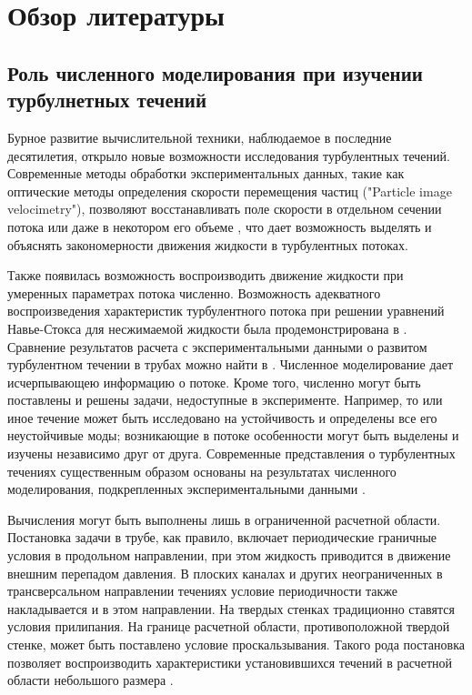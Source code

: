 \chapter{Обзор литературы}

	
\section{Роль численного моделирования при изучении турбулнетных течений}

Бурное развитие вычислительной техники, наблюдаемое в последние десятилетия, открыло новые возможности исследования турбулентных течений. Современные методы обработки экспериментальных данных, такие как оптические методы определения скорости перемещения частиц ("Particle image velocimetry"), позволяют восстанавливать поле скорости в отдельном сечении потока или даже в некотором его объеме \cite{PIVbook}, что дает возможность выделять и объяснять закономерности движения жидкости в турбулентных потоках. 

Также появилась возможность воспроизводить движение жидкости при умеренных параметрах потока численно. Возможность адекватного воспроизведения характеристик турбулентного потока при решении уравнений Навье-Стокса для несжимаемой жидкости была продемонстрирована в \cite{Kim1987}. Сравнение результатов расчета с экспериментальными данными о развитом турбулентном течении в трубах можно найти в \cite{Priymak1998, Nikitin2006}. Численное моделирование дает исчерпывающею информацию о потоке. Кроме того, численно могут быть поставлены и решены задачи, недоступные в эксперименте. Например, то или иное течение может быть исследовано на устойчивость и определены все его неустойчивые моды; возникающие в потоке особенности могут быть выделены и изучены независимо друг от друга. Современные представления о турбулентных течениях существенным образом основаны на результатах численного моделирования, подкрепленных экспериментальными данными \cite{Manneville2015, Manneville2016}.

Вычисления могут быть выполнены лишь в ограниченной расчетной области. Постановка задачи в трубе, как правило, включает периодические граничные условия в продольном направлении, при этом жидкость приводится в движение внешним перепадом давления. В плоских каналах и других неограниченных в трансверсальном направлении течениях условие периодичности также накладывается и в этом направлении. На твердых стенках традиционно ставятся условия прилипания. На границе расчетной области, противоположной твердой стенке, может быть поставлено условие проскальзывания. Такого рода постановка позволяет воспроизводить характеристики установившихся течений в расчетной области небольшого размера \cite{Kim1987, Priymak1998, Nikitin2006}. 


